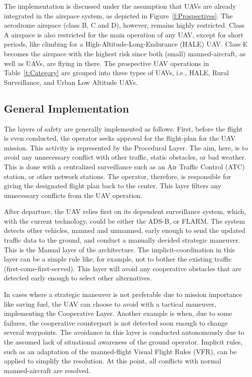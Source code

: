 The implementation is discussed under the assumption that UAVs are already integrated in the airspace system, as depicted in Figure~\ref{f:Prospectives}. The aerodrome airspace (class B, C and D), however, remains highly restricted. Class A airspace is also restricted for the main operation of any UAV, except for short periods, like climbing for a High-Altitude-Long-Endurance (HALE) UAV. Class E becomes the airspace with the highest risk since both (small) manned-aircraft, as well as UAVs, are flying in there. The prospective UAV operations in Table~\ref{t:Category} are grouped into three types of UAVs, i.e., HALE, Rural Surveillance, and Urban Low Altitude UAVs.

\subsection{General Implementation}

The layers of safety are generally implemented as follows. First, before the flight is even conducted, the operator seeks approval for the flight-plan for the UAV mission. This activity is represented by the Procedural Layer. The aim, here, is to avoid any unnecessary conflict with other traffic, static obstacles, or bad weather. This is done with a centralized surveillance such as an Air Traffic Control (ATC) station, or other network stations. The operator, therefore, is responsible for giving the designated flight plan back to the center. This layer filters any unnecessary conflicts from the UAV operation.

After departure, the UAV relies first on its dependent surveillance system, which, with the current technology, could be either the ADS-B, or FLARM\footnotemark[4]. The system detects other vehicles, manned and unmanned, early enough to send the updated traffic data to the ground, and conduct a manually decided strategic maneuver. This is the Manual layer of the architecture. The implicit-coordination in this layer can be a simple rule like, for example, not to bother the existing traffic (first-come-first-served). This layer will avoid any cooperative obstacles that are detected early enough to select other alternatives.

In cases where a strategic maneuver is not preferable due to mission importance like saving fuel, the UAV can choose to avoid with a tactical maneuver, implementing the Cooperative Layer. Another example is when, due to some failures, the cooperative counterpart is not detected soon enough to change several waypoints. The avoidance in this layer is conducted autonomously due to the assumed lack of situational awareness of the ground operator. Implicit rules, such as an adaptation of the manned-flight Visual Flight Rules (VFR)\cite{FAR:91}, can be applied to simplify the resolution. At this point, all conflicts with normal manned-aircraft are resolved. 

